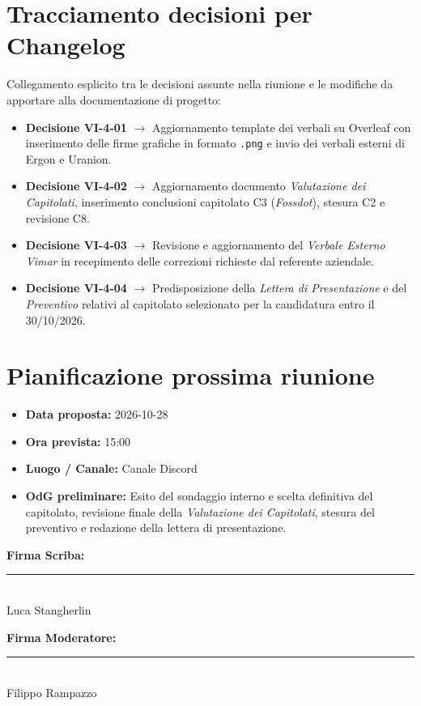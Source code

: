 \documentclass[12pt,a4paper]{article}
\newcommand{\tightlist}{\setlength{\itemsep}{1pt}\setlength{\parskip}{0pt}}
\begin{document}
\hypertarget{tracciamento-decisioni}{%
\section{Tracciamento decisioni per Changelog}}

Collegamento esplicito tra le decisioni assunte nella riunione e le modifiche da apportare alla documentazione di progetto:

\begin{itemize}
\tightlist
\item \textbf{Decisione VI-4-01} $\rightarrow$ Aggiornamento template dei verbali su Overleaf con inserimento delle firme grafiche in formato \texttt{.png} e invio dei verbali esterni di Ergon e Uranion.
\item \textbf{Decisione VI-4-02} $\rightarrow$ Aggiornamento documento \emph{Valutazione dei Capitolati}, inserimento conclusioni capitolato C3 (\emph{Fossdot}), stesura C2 e revisione C8.
\item \textbf{Decisione VI-4-03} $\rightarrow$ Revisione e aggiornamento del \emph{Verbale Esterno Vimar} in recepimento delle correzioni richieste dal referente aziendale.
\item \textbf{Decisione VI-4-04} $\rightarrow$ Predisposizione della \emph{Lettera di Presentazione} e del \emph{Preventivo} relativi al capitolato selezionato per la candidatura entro il 30/10/2026.
\end{itemize}

\hypertarget{prossima-riunione}{%
\section{Pianificazione prossima riunione}}

\begin{itemize}
\tightlist
\item \textbf{Data proposta:} 2026-10-28
\item \textbf{Ora prevista:} 15:00
\item \textbf{Luogo / Canale:} Canale Discord
\item \textbf{OdG preliminare:} Esito del sondaggio interno e scelta definitiva del capitolato, revisione finale della \emph{Valutazione dei Capitolati}, stesura del preventivo e redazione della lettera di presentazione.
\end{itemize}

\vspace{35pt}
\noindent
\begin{minipage}[t]{0.45\textwidth}
\textbf{Firma Scriba:}\\[18pt]
\rule{55mm}{0.5pt}\\[2pt]
\small Luca Stangherlin
\end{minipage}
\hfill
\begin{minipage}[t]{0.45\textwidth}
\begin{flushright}
\textbf{Firma Moderatore:}\\[18pt]
\rule{55mm}{0.5pt}\\[2pt]
\small Filippo Rampazzo
\end{flushright}
\end{minipage}
\end{document}
